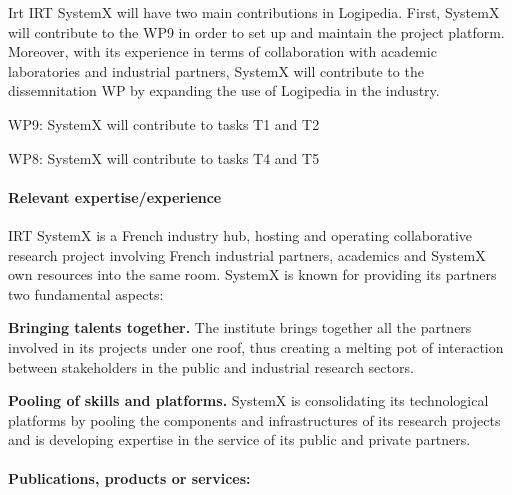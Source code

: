 \begin{sitedescription}{Irt}
IRT SystemX will have two main contributions in Logipedia. First, SystemX will contribute to the WP9 in order to set up and maintain the project platform. Moreover, with its experience in terms of collaboration with academic laboratories and industrial partners, SystemX will contribute to the dissemnitation WP by expanding the use of Logipedia in the industry.






\begin{compactitem}
\item WP9: SystemX will contribute to tasks T1 and T2
\item WP8: SystemX will contribute to tasks T4 and T5
\end{compactitem}




\paragraph{Relevant expertise/experience}

IRT SystemX is a French industry hub, hosting and operating collaborative research project involving French industrial partners, academics and SystemX own resources into the same room. SystemX is known for providing its partners two fundamental aspects:

\begin{compactitem}
\item {\bf Bringing talents together.} The institute brings together all the partners involved in its projects under one roof, thus creating a melting pot of interaction between stakeholders in the public and industrial research sectors.
\item {\bf Pooling of skills and platforms.} SystemX is consolidating its technological platforms by pooling the components and infrastructures of its research projects and is developing expertise in the service of its public and private partners.
\end{compactitem}




\paragraph{Publications, products or services:}


\end{sitedescription}
